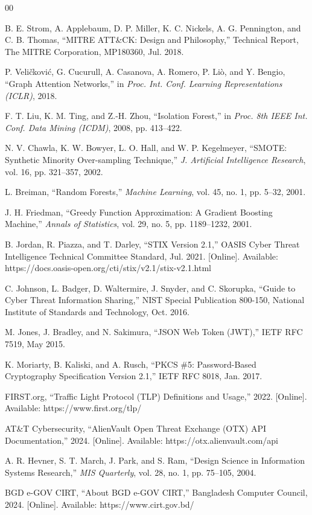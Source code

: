 \documentclass[conference]{IEEEtran}
\begin{document}
\begin{thebibliography}{00}

 B. E. Strom, A. Applebaum, D. P. Miller, K. C. Nickels, A. G. Pennington, and C. B. Thomas, ``MITRE ATT\&CK: Design and Philosophy,'' Technical Report, The MITRE Corporation, MP180360, Jul. 2018.

 P. Veli\v{c}kovi\'{c}, G. Cucurull, A. Casanova, A. Romero, P. Li\`{o}, and Y. Bengio, ``Graph Attention Networks,'' in \textit{Proc. Int. Conf. Learning Representations (ICLR)}, 2018.

 F. T. Liu, K. M. Ting, and Z.-H. Zhou, ``Isolation Forest,'' in \textit{Proc. 8th IEEE Int. Conf. Data Mining (ICDM)}, 2008, pp. 413--422.

 N. V. Chawla, K. W. Bowyer, L. O. Hall, and W. P. Kegelmeyer, ``SMOTE: Synthetic Minority Over-sampling Technique,'' \textit{J. Artificial Intelligence Research}, vol. 16, pp. 321--357, 2002.

 L. Breiman, ``Random Forests,'' \textit{Machine Learning}, vol. 45, no. 1, pp. 5--32, 2001.

 J. H. Friedman, ``Greedy Function Approximation: A Gradient Boosting Machine,'' \textit{Annals of Statistics}, vol. 29, no. 5, pp. 1189--1232, 2001.

 B. Jordan, R. Piazza, and T. Darley, ``STIX Version 2.1,'' OASIS Cyber Threat Intelligence Technical Committee Standard, Jul. 2021. [Online]. Available: https://docs.oasis-open.org/cti/stix/v2.1/stix-v2.1.html

 C. Johnson, L. Badger, D. Waltermire, J. Snyder, and C. Skorupka, ``Guide to Cyber Threat Information Sharing,'' NIST Special Publication 800-150, National Institute of Standards and Technology, Oct. 2016.

 M. Jones, J. Bradley, and N. Sakimura, ``JSON Web Token (JWT),'' IETF RFC 7519, May 2015.

 K. Moriarty, B. Kaliski, and A. Rusch, ``PKCS \#5: Password-Based Cryptography Specification Version 2.1,'' IETF RFC 8018, Jan. 2017.

 FIRST.org, ``Traffic Light Protocol (TLP) Definitions and Usage,'' 2022. [Online]. Available: https://www.first.org/tlp/

 AT\&T Cybersecurity, ``AlienVault Open Threat Exchange (OTX) API Documentation,'' 2024. [Online]. Available: https://otx.alienvault.com/api

 A. R. Hevner, S. T. March, J. Park, and S. Ram, ``Design Science in Information Systems Research,'' \textit{MIS Quarterly}, vol. 28, no. 1, pp. 75--105, 2004.

 BGD e-GOV CIRT, ``About BGD e-GOV CIRT,'' Bangladesh Computer Council, 2024. [Online]. Available: https://www.cirt.gov.bd/

\end{thebibliography}
\end{document}
